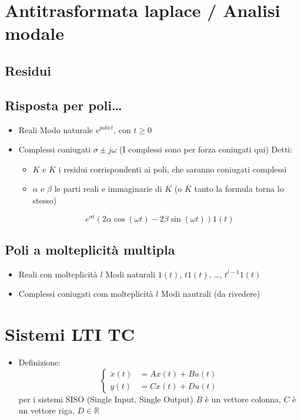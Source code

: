 \documentclass[11pt]{article}
\begin{document}
\section{Antitrasformata laplace / Analisi modale}
\label{sec:orgbf9fcc9}
\subsection{Residui}
\label{sec:org58ff083}

\subsection{Risposta per poli\ldots{}}
\label{sec:org66c52a8}
\begin{itemize}
\item Reali 
Modo naturale \(e^{polo\ t}\), con \(t \geq 0\)
\item Complessi coniugati \(\sigma \pm j\omega\) (I complessi sono per forza coniugati qui)
Detti:
\begin{itemize}
\item \(K\) e \(\overline{K}\) i residui corrispondenti ai poli, che saranno coniugati complessi
\item \(\alpha\) e \(\beta\) le parti reali e immaginarie di \(K\)
(o \(\overline{K}\) tanto la formula torna lo stesso)
\end{itemize}
\[ e^{\sigma t} (2 \alpha \cos(\omega t) - 2 \beta \sin(\omega t)) 1(t) \]
\end{itemize}

\subsection{Poli a molteplicità multipla}
\label{sec:org72c26c6}
\begin{itemize}
\item Reali con molteplicità \(l\)
Modi naturali \(1(t)\), \(t 1(t)\), \ldots{}, \(t^{l-1} 1(t)\)
\item Complessi coniugati com molteplicità \(l\)
Modi nautrali (da rivedere)
\end{itemize}


\section{Sistemi LTI TC}
\label{sec:orga8b4b24}
\begin{itemize}
\item Definizione:
\[\begin{cases}
	  \dot{x}(t) &= Ax(t) + Bu(t) \\
	  y(t) &= Cx(t) + Du(t)
	  \end{cases} \]
per i sistemi SISO (Single Input, Single Output) \(B\) è un vettore colonna,
\(C\) è un vettore riga, \(D \in \mathbb{R}\)
\end{itemize}
\end{document}
